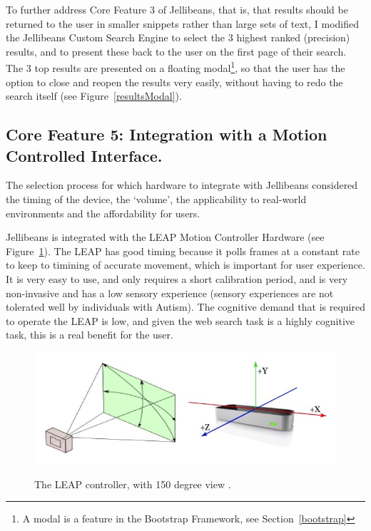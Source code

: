 \documentclass[a4paper, 11pt]{article}
\begin{document}
\vspace{5mm} %
To further address Core Feature 3 of Jellibeans, that is, that results should be returned to the user in smaller snippets rather than large sets of text, I modified the Jellibeans Custom Search Engine to select the 3 highest ranked (precision) results, and to present these back to the user on the first page of their search. The 3 top results are presented on a floating modal\footnote{A modal is a feature in the Bootstrap Framework, see Section~\ref{bootstrap}}, so that the user has the option to close and reopen the results very easily, without having to redo the search itself (see Figure~\ref{resultsModal}).


\subsection{Core Feature 5: Integration with a Motion Controlled Interface.}

The selection process for which hardware to integrate with Jellibeans considered the timing of the device, the `volume', the applicability to real-world environments and the affordability for users.

\vspace{5mm}
Jellibeans is integrated with the LEAP Motion Controller Hardware (see Figure~\ref{leap}). The LEAP has good timing because it polls frames at a constant rate to keep to timining of accurate movement, which is important for user experience. It is very easy to use, and only requires a short calibration period, and is very non-invasive and has a low sensory experience (sensory experiences are not tolerated well by individuals with Autism). The cognitive demand that is required to operate the LEAP is low, and given the web search task is a highly cognitive task, this is a real benefit for the user.

\begin{figure}[H]
\begin{center}
\includegraphics[scale=0.3]{leap}\\
\caption{The LEAP controller, with 150 degree view \cite{leap}.}
\label{leap}
\end{center}
\end{figure}
\end{document}
